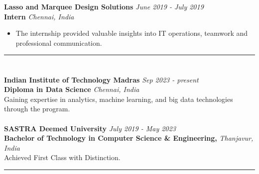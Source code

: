 \documentclass[a4paper,10pt]{article}
\begin{document}
\textbf{Lasso and Marquee Design Solutions} \href{https://drive.google.com/file/d/1fMTBkQUhU6_34D5mxVZRf7wBHGMJPdVi/view?usp=sharing}{} \hfill \textit{June 2019 - July 2019} \\
\textbf{Intern} \hfill \textit{Chennai, India}
\vspace{-2mm}
\begin{itemize}
    \item The internship provided valuable insights into IT operations, teamwork and professional communication.
\end{itemize}
\vspace{2mm}

\hrule
\section{\scshape\color{Fuchsia}{\faGraduationCap\ \textbf EDUCATION}}
\textbf{Indian Institute of Technology Madras} \href{https://drive.google.com/file/d/1HUZf7LIsTZaPjUkf3tKMAnduHmgObdS1/view?usp=sharing}{} \hfill \textit{Sep 2023 - present} \\
\textbf{Diploma in Data Science} \hfill \textit{Chennai, India} \\
Gaining expertise in analytics, machine learning, and big data technologies through the program. \\
\\
\textbf{SASTRA Deemed University} \href{https://drive.google.com/file/d/1phkkQpvXzo3_0dZZnujCL_nOU1YJfxKO/view?usp=sharing}{} \hfill \textit{July 2019 - May 2023} \\
\textbf{Bachelor of Technology in Computer Science \& Engineering,} \hfill \textit{Thanjavur, India} \\
Achieved First Class with Distinction. \\

\hrule
\end{document}
